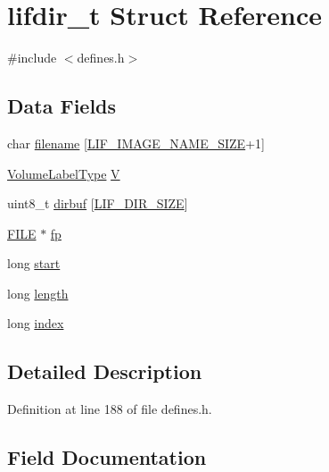 \hypertarget{structlifdir__t}{}\section{lifdir\+\_\+t Struct Reference}
\label{structlifdir__t}


{\ttfamily \#include $<$defines.\+h$>$}

\subsection*{Data Fields}
\begin{DoxyCompactItemize}
\item 
char \hyperlink{structlifdir__t_a21bfa7a6d54009982cc63962951ba615}{filename} \mbox{[}\hyperlink{defines_8h_a8cfa79b094fc3a5db37b26761a639e6d}{L\+I\+F\+\_\+\+I\+M\+A\+G\+E\+\_\+\+N\+A\+M\+E\+\_\+\+S\+I\+ZE}+1\mbox{]}
\item 
\hyperlink{structVolumeLabelType}{Volume\+Label\+Type} \hyperlink{structlifdir__t_a5a888dc3f1844ff0c8203d5bb0aa48b4}{V}
\item 
uint8\+\_\+t \hyperlink{structlifdir__t_a993ecf6e2652f0e12d56f96a34b806e1}{dirbuf} \mbox{[}\hyperlink{defines_8h_a99ad70dd3200a3ee46388bc2c36fe720}{L\+I\+F\+\_\+\+D\+I\+R\+\_\+\+S\+I\+ZE}\mbox{]}
\item 
\hyperlink{posix_8h_aed4dabeb9f7c518ded42f930a04abce8}{F\+I\+LE} $\ast$ \hyperlink{structlifdir__t_ad764305f0b8c8b95ea0f0690530babcb}{fp}
\item 
long \hyperlink{structlifdir__t_a4f82d919dbc56557a5dcb3e3d9e016c6}{start}
\item 
long \hyperlink{structlifdir__t_a6645831320dcb5d1383a8796ae49a3e8}{length}
\item 
long \hyperlink{structlifdir__t_a7b9b45ee1a56ba386158da051605a8bd}{index}
\end{DoxyCompactItemize}


\subsection{Detailed Description}


Definition at line 188 of file defines.\+h.



\subsection{Field Documentation}
